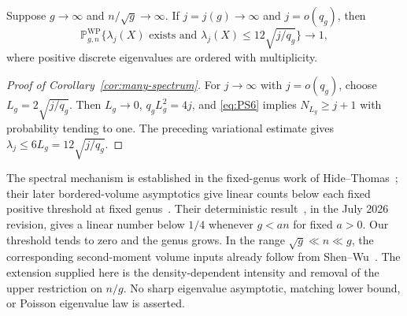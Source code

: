 \begin{corollary}\label{cor:many-spectrum}
Suppose $g\to\infty$ and $n/\sqrt g\to\infty$. If $j=j(g)\to\infty$
and $j=o(q_g)$, then
\[
 \mathbb P^{\mathrm{WP}}_{g,n}
 \{\lambda_j(X)\text{ exists and }\lambda_j(X)\le12\sqrt{j/q_g}\}
 \longrightarrow1,
\]
where positive discrete eigenvalues are ordered with multiplicity.
\end{corollary}

\begin{proof}[Proof of Corollary~\ref{cor:many-spectrum}]
For $j\to\infty$ with $j=o(q_g)$, choose $L_g=2\sqrt{j/q_g}$.
Then $L_g\to0$, $q_gL_g^2=4j$, and \eqref{eq:PS6} implies
$N_{L_g}\ge j+1$ with probability tending to one. The preceding
variational estimate gives $\lambda_j\le6L_g=12\sqrt{j/q_g}$.
\end{proof}

The spectral mechanism is established in the fixed-genus work of
Hide--Thomas~\cite[Theorem~1.10 and Remark~5.5]{HTSphere}; their later
bordered-volume asymptotics give linear counts below each fixed positive
threshold at fixed genus~\cite[Theorem~1.1]{HTLargeN}.
Their deterministic result~\cite[Theorem~1.3]{HTMany}, in the July 2026
revision, gives a linear number below $1/4$ whenever $g<an$ for fixed
$a>0$. Our threshold tends to zero and the genus grows. In the range
$\sqrt g\ll n\ll g$, the corresponding second-moment volume inputs
already follow from Shen--Wu~\cite{SW}. The extension supplied here is
the density-dependent intensity and removal of the upper restriction on
$n/g$. No sharp eigenvalue asymptotic, matching lower bound, or
Poisson eigenvalue law is asserted.
